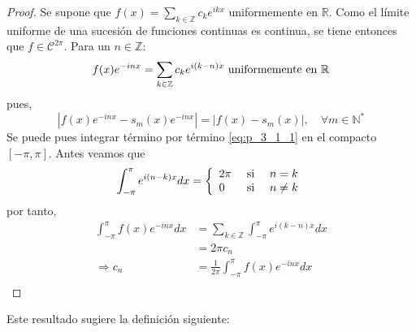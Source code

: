 \documentclass[12pt]{report}
\newcounter{it}
\theoremstyle{largebreak}
\newcommand\abs[1]{\ensuremath{\left|#1\right|}}
\begin{document}
    \begin{proof}
        Se supone que $f(x)=\sum_{k\in\mathbb{Z}}c_k e^{ ikx}$ uniformemente en $\mathbb{R}$. Como el límite uniforme de una sucesión de funciones continuas es continua, se tiene entonces que $f\in\mathcal{C}^{2\pi}$. Para un $n\in\mathbb{Z}$:
        \begin{equation}
            \begin{split}
                f(x)e^{ -inx}=\sum_{k\in\mathbb{Z}}c_k e^{ i(k-n)x}\textup{ uniformemente en }\mathbb{R}
            \end{split}
            \label{eq:p_3_1_1}
        \end{equation}
        pues,
        \begin{equation*}
            \abs{f(x)e^{ -inx}-s_m(x)e^{-inx}}=\abs{f(x)-s_m(x)},\quad\forall m\in\mathbb{N}^*
        \end{equation*}
        Se puede pues integrar término por término \ref{eq:p_3_1_1} en el compacto $[-\pi,\pi]$. Antes veamos que
        \begin{equation*}
            \begin{split}
                \int_{ -\pi}^{\pi}e^{ i(n-k)x}dx=\left\{
                    \begin{array}[pos]{lcr}
                        2\pi & \textup{ si } & n=k\\
                        0 & \textup{ si } & n\neq k\\
                    \end{array}
                \right.
            \end{split}
        \end{equation*}
        por tanto,
        \begin{equation*}
            \begin{split}
                \int_{-\pi}^\pi f(x)e^{ -inx}dx&=\sum_{ k\in\mathbb{Z}}\int_{-\pi}^\pi e^{ i(k-n)x}dx\\
                &= 2\pi c_n\\
                \Rightarrow c_n&=\frac{1}{2\pi}\int_{-\pi}^\pi f(x)e^{ -inx}dx\\
            \end{split}
        \end{equation*}
    \end{proof}
    
    Este resultado sugiere la definición siguiente:
\end{document}
